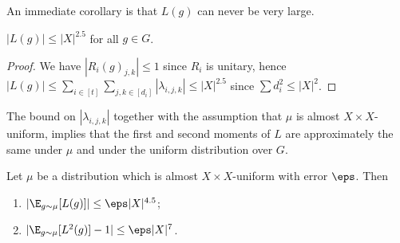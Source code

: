 An immediate corollary is that $L(g)$ can never be very large.

\begin{corollary}\label{cor:L_bound_infty}
$|L(g)| \le |X|^{2.5}$ for all $g \in G$.
\end{corollary}

\begin{proof}
We have $|R_i(g)_{j,k}| \le 1$ since $R_i$ is unitary, hence $|L(g)|
\le \sum_{i \in [t]} \sum_{j,k \in [d_i]} |\lambda_{i,j,k}|
\le |X|^{2.5}$ since $\sum d_i^2 \le |X|^2$.
\end{proof}

The bound on $|\lambda_{i,j,k}|$ together with the assumption
that $\mu$ is almost $X \times X$-uniform, implies that the first
and second moments of $L$ are approximately
the same under $\mu$ and under the uniform distribution over $G$.

\begin{proposition}\label{prop:L_moments_approx}
Let $\mu$ be a distribution which is
almost $X \times X$-uniform with error $\eps$. Then
\begin{enumerate}
\item $|\E_{g \sim \mu}[L(g)]| \le \eps |X|^{4.5}$;
\item $|\E_{g \sim \mu}[L^2(g)]-1| \le \eps |X|^7$.
\end{enumerate}
\end{proposition}

